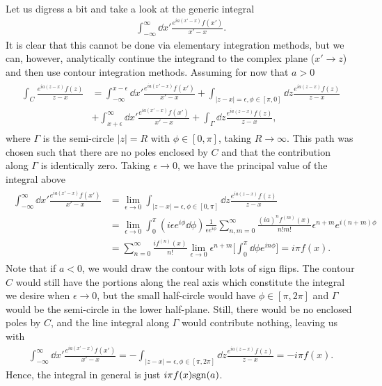{{ \color{red}
Let us digress a bit and take a look at the generic integral
\begin{eqnarray}
    \int_{-\infty}^{\infty} \dd{x'} \frac{e^{ia(x'-x)}f(x')}{x'-x}
.\end{eqnarray}
It is clear that this cannot be done via elementary integration methods, but we can, however, analytically continue the integrand to the complex plane ($x' \rightarrow z$) and then use contour integration methods.
Assuming for now that $a > 0$
\begin{eqnarray}
\begin{aligned}
    \int_{C} \frac{e^{ia(z-x)} f(z)}{z-x} &= \int_{-\infty}^{x-\epsilon} \dd{x'} \frac{e^{ia(x'-x)}f(x')}{x'-x} + \int_{|z-x|=\epsilon,\phi \in [\pi,0]} \dd{z} \frac{e^{ia(z-x)}f(z)}{z - x} \\
    &+ \int_{x+\epsilon}^{\infty} \dd{x'} \frac{e^{ia(x'-x)}f(x')}{x'-x} + \int_{\Gamma} \dd{z} \frac{e^{ia(z-x)}f(z)}{z-x}
,\end{aligned}
\end{eqnarray}
where $\Gamma$ is the semi-circle $|z| = R$ with $\phi \in [0,\pi]$, taking $R \rightarrow \infty$.
This path was chosen such that there are no poles enclosed by $C$ and that the contribution along $\Gamma$ is identically zero.
Taking $\epsilon \rightarrow 0$, we have the principal value of the integral above
\begin{eqnarray}
\begin{aligned}
    \int_{-\infty}^{\infty} \dd{x'} \frac{e^{ia(x'-x)}f(x')}{x'-x} &= \lim_{\epsilon \rightarrow 0} \int_{|z-x|=\epsilon,\phi \in [0,\pi]} \dd{z} \frac{e^{ia(z-x)}f(z)}{z-x} \\
    &= \lim_{\epsilon \rightarrow 0} \int_{0}^{\pi} (i \epsilon e^{i\phi} \dd{\phi}) \frac{1}{\epsilon e^{i\phi}} \sum_{n,m=0}^{\infty} \frac{(ia)^{n}f^{(m)}(x)}{n!m!} \epsilon^{n+m} e^{i (n+m) \phi} \\
    &= \sum_{n=0}^{\infty} \frac{i f^{(n)}(x)}{n!} \lim_{\epsilon \rightarrow 0} \epsilon^{n+m} \Big[ \int_{0}^{\pi} \dd{\phi} e^{i n \phi} \Big] = i \pi f(x)
.\end{aligned}
\end{eqnarray}
Note that if $a < 0$, we would draw the contour with lots of sign flips.
The contour $C$ would still have the portions along the real axis which constitute the integral we desire when $\epsilon \rightarrow 0$, but the small half-circle would have $\phi \in [\pi,2\pi]$ and $\Gamma$ would be the semi-circle in the lower half-plane.
Still, there would be no enclosed poles by $C$, and the line integral along $\Gamma$ would contribute nothing, leaving us with
\begin{eqnarray}
    \int_{-\infty}^{\infty} \dd{x'} \frac{e^{ia(x'-x)}f(x')}{x'-x} = -\int_{|z-x|=\epsilon,\phi \in [\pi,2\pi]} \dd{z} \frac{e^{ia(z-x)}f(z)}{z-x} = - i \pi f(x)
.\end{eqnarray}
Hence, the integral in general is just $i\pi f(x) {\rm sgn}(a)$.

}}

